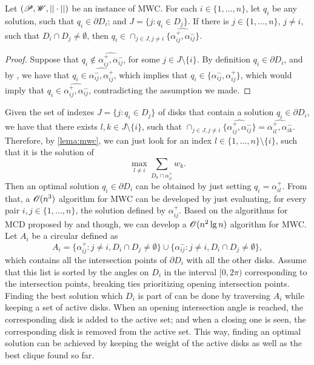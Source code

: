 \begin{lema}\label{lema:mwc}
	Let $(\mathscr{P}, \mathscr{W}, ||\cdot||)$ be an instance of MWC. For each $i\in \{1, \dots, n\}$,
	let $q_i$ be any solution, such that $q_i \in \partial D_i$; and $J=\{j \colon q_i \in D_j\}$. If there is \mbox{$j \in \{1, \dots, n\}$}, $j\neq i$, such that $D_i \cap D_j \neq \emptyset$, then $q_i \in \cap_{j \in J, j\neq i}\{\widehat{\alpha_{ij}^+, \alpha_{ij}^-}\}$.
\end{lema}

\begin{proof}
	Suppose that $q_i \not \in \widehat{\alpha_{ij}^+, \alpha_{ij}^-}$, for some $j \in J\setminus \{i\}$.
	By definition $q_i \in \partial D_i$, and by , we have that $q_i \in \widehat{\alpha_{ij}^-, \alpha_{ij}^+}$, which implies that $q_i \in \{\alpha_{ij}^-, \alpha_{ij}^+\}$, which would imply that  $q_i \in \widehat{\alpha_{ij}^+, \alpha_{ij}^-}$, contradicting the assumption we made.
\end{proof}

Given the set of indexes $J=\{j \colon q_i \in D_j\}$ of disks that contain a solution $q_i\in\partial D_i$, we have that there exists $l, k \in J\setminus \{i\}$, such that  $\cap_{j \in J, j\neq i}\{\widehat{\alpha_{ij}^+, \alpha_{ij}^-}\} = \widehat{\alpha_{il}^+, \alpha_{ik}^-}$. Therefore, by \autoref{lema:mwc}, we can just look for an index $l \in \{1, \dots, n\} \setminus \{i\}$, such that it is the solution of $$\max_{l \neq i} \sum_{D_k \cap \alpha_{il}^+} w_k.$$ 
Then an optimal solution $q_i \in \partial D_i$ can be obtained by just setting $q_i = \alpha_{il}^+$. From that, a $\mathscr{O}(n^3)$ algorithm for MWC can be developed by just evaluating, for every pair $i, j \in \{1, \dots, n\}$, the solution defined by $\alpha_{ij}^+$. 
Based on the algorithms for MCD proposed by  and  though, we can develop a $\mathscr{O}(n^2\lg{n})$ algorithm for MWC.
Let $A_i$ be a circular defined as 
\begin{equation*}
	A_i = \{\alpha_{ij}^+ \colon j\neq i, D_i \cap D_j \neq \emptyset\} \cup \{\alpha_{ij}^- \colon j\neq i, D_i \cap D_j \neq \emptyset \},
\end{equation*}
which contains all the intersection points of $\partial D_i$ with all the other disks. Assume that this list is sorted by the angles on $D_i$ in the interval $[0, 2\pi)$ corresponding to the intersection points, breaking ties prioritizing opening intersection points. 
Finding the best solution which $D_i$ is part of can be done by traversing $A_i$ while keeping a set of active disks. When an opening intersection angle is reached, the corresponding disk is added to the active set; and when a closing one is seen, the corresponding disk is removed from the active set. This way, finding an optimal solution can be achieved by keeping the weight of the active disks as well as the best clique found so far.

